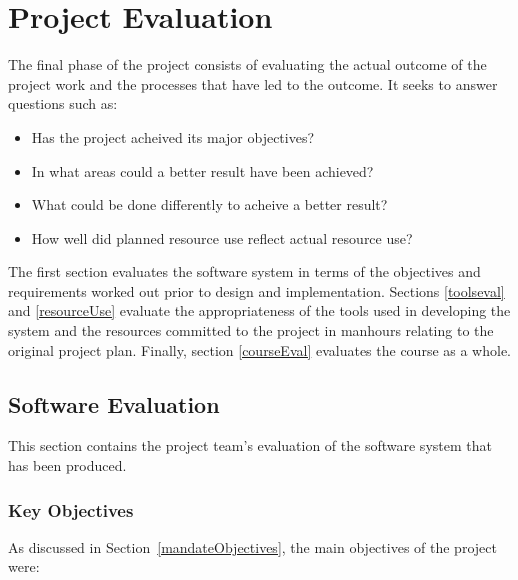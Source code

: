  

\chapter{Project Evaluation}\label{eval}

\minitoc


The final phase of the project consists of evaluating the actual outcome of
the project work and the processes that have led to the outcome. It
seeks to answer questions such as:

\begin{itemize}
\item Has the project acheived its major objectives?
\item In what areas could a better result have been achieved?
\item What could be done differently to acheive a better result?
\item How well did planned resource use reflect actual resource use?
\end{itemize}

The first section evaluates the software system in terms of the
objectives and requirements worked out prior to design and
implementation.  Sections \ref{toolseval} and \ref{resourceUse}
evaluate the appropriateness of the tools used in developing the
system and the resources committed to the project in manhours relating
to the original project plan. Finally, section \ref{courseEval}
evaluates the course as a whole.

\section{Software Evaluation}

This section contains the project team's evaluation of the software
system that has been produced.

\subsection{Key Objectives}

As discussed in Section~\ref{mandateObjectives}, the main objectives of the project were:

